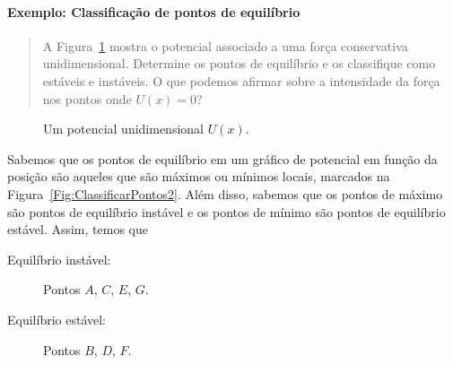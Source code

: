 \paragraph{Exemplo: Classificação de pontos de equilíbrio}

\begin{quote}
A Figura~\ref{Fig:ClassificarPontos} mostra o potencial associado a uma força conservativa unidimensional. Determine os pontos de equilíbrio e os classifique como estáveis e instáveis. O que podemos afirmar sobre a intensidade da força nos pontos onde $U(x) = 0$?
\end{quote}

\begin{figure}
\centering
{}
\caption{Um potencial unidimensional $U(x)$. \label{Fig:ClassificarPontos}}
\end{figure}

Sabemos que os pontos de equilíbrio em um gráfico de potencial em função da posição são aqueles que são máximos ou mínimos locais, marcados na Figura~\ref{Fig:ClassificarPontos2}. Além disso, sabemos que os pontos de máximo são pontos de equilíbrio instável e os pontos de mínimo são pontos de equilíbrio estável. Assim, temos que
\begin{description}
    \item[Equilíbrio instável:] Pontos $A$, $C$, $E$, $G$.
    \item[Equilíbrio estável:] Pontos $B$, $D$, $F$.
\end{description}

